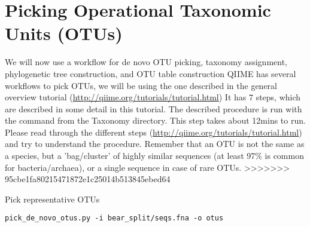 \section{Picking Operational Taxonomic Units (OTUs)}
We will now use a workflow for de novo OTU picking, taxonomy assignment, phylogenetic tree construction, and OTU table construction QIIME has several workflows to pick OTUs, we will be using the one described in the general overview tutorial (\url{http://qiime.org/tutorials/tutorial.html}) It has 7 steps, which are described in some detail in this tutorial. 
The described procedure is run with the command from the Taxonomy directory. This step takes about 12mins to run. Please read through the different steps (\url{http://qiime.org/tutorials/tutorial.html}) and try to understand the procedure. Remember that an OTU is not the same as a species, but a 'bag/cluster' of highly similar sequences (at least 97\% is common for bacteria/archaea), or a single sequence in case of rare OTUs.
>>>>>>> 95cbe1fa80215471872e1c25014b513845ebed64

\begin{steps}
Pick representative OTUs

\begin{lstlisting}
pick_de_novo_otus.py -i bear_split/seqs.fna -o otus   
\end{lstlisting}
\end{steps}

